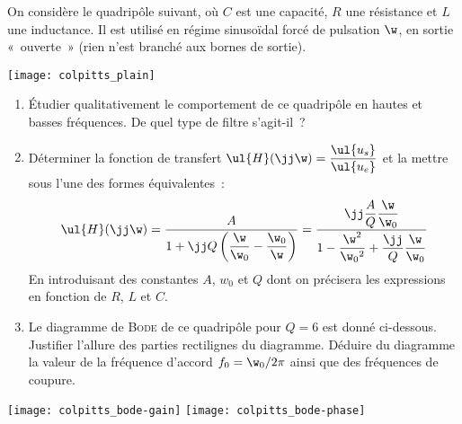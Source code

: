 \documentclass[a4paper, 12pt, final, garamond]{book}
\begin{document}
\begin{minipage}{.50\linewidth}
    On considère le quadripôle suivant, où $C$ est une capacité, $R$ une
    résistance et $L$ une inductance. Il est utilisé en régime sinusoïdal forcé
    de pulsation $\w$, en sortie «~ouverte~» (rien n'est branché aux bornes de
    sortie).
\end{minipage}
\begin{minipage}{0.50\linewidth}
    \begin{center}
        \texttt{[image: colpitts\_plain]}
    \end{center}
\end{minipage}
\begin{enumerate}
    \item Étudier qualitativement le comportement de ce quadripôle en hautes et
        basses fréquences. De quel type de filtre s'agit-il~?
    \item Déterminer la fonction de transfert $\ul{H}(\jj\w) =
        \dfrac{\ul{u_s}}{\ul{u_e}}$ et la mettre sous l'une des formes
        équivalentes~:
        \[\ul{H}(\jj\w) = \frac{A}{1+\jj Q \left( \dfrac{\w}{\w_0} -
            \dfrac{\w_0}{\w} \right)} = \frac{\jj\dfrac{A}{Q}\dfrac{\w}{\w_0}}{1
    - \dfrac{\w^2}{\w_0{}^2} + \dfrac{\jj}{Q} \dfrac{\w}{\w_0}}\]
        En introduisant des constantes $A$, $w_0$ et $Q$ dont on précisera les
        expressions en fonction de $R$, $L$ et $C$.
    \item Le diagramme de \textsc{Bode} de ce quadripôle pour $Q = 6$ est donné
        ci-dessous. Justifier l'allure des parties rectilignes du diagramme.
        Déduire du diagramme la valeur de la fréquence d'accord $f_0 =
        \w_0/2\pi$ ainsi que des fréquences de coupure.
\end{enumerate}
\begin{center}
    \texttt{[image: colpitts\_bode-gain]}
    \texttt{[image: colpitts\_bode-phase]}
\end{center}
\end{document}
